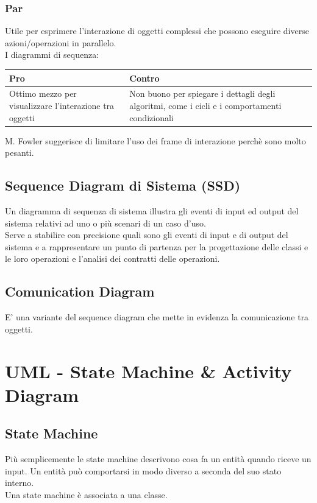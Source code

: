 \documentclass[12pt, a4paper]{report}
\begin{document}
\subsection{Par}
Utile per esprimere l'interazione di oggetti complessi che possono eseguire diverse azioni/operazioni in parallelo.\\
I diagrammi di sequenza:
\begin{center}
    \begin{tabular}{| p{8cm} | p{8cm} |}
        \hline
        \textbf{Pro} & \textbf{Contro} \\
        \hline
        Ottimo mezzo per visualizzare l'interazione tra oggetti & Non buono per spiegare i dettagli degli algoritmi, come i cicli e i comportamenti condizionali \\
        \hline
    \end{tabular}
\end{center}
M. Fowler suggerisce di limitare l'uso dei frame di interazione perchè sono molto pesanti.
\section{Sequence Diagram di Sistema (SSD)}
Un diagramma di sequenza di sistema illustra gli eventi di input ed output del sistema relativi ad uno o più scenari di un caso d'uso.\\
Serve a stabilire con precisione quali sono gli eventi di input e di output del sistema e a rappresentare un punto di partenza per la progettazione delle classi e le loro operazioni e l'analisi dei contratti delle operazioni.
\section{Comunication Diagram}
E' una variante del sequence diagram che mette in evidenza la comunicazione tra oggetti.
\chapter{UML - State Machine \& Activity Diagram}
\section{State Machine}
Più semplicemente le state machine descrivono cosa fa un entità quando riceve un input. Un entità può comportarsi in modo diverso a seconda del suo stato interno.\\
Una state machine è associata a una classe.
\end{document}
